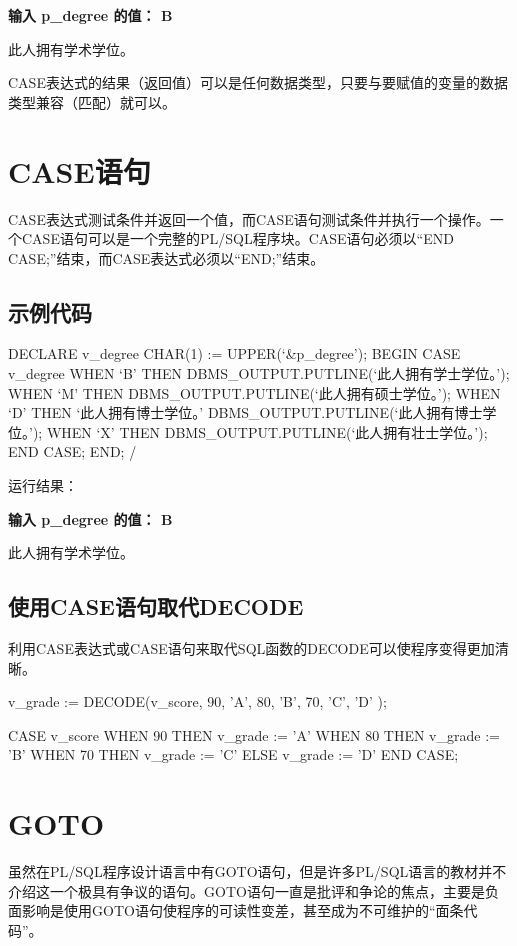\documentclass[11pt, a4paper, oneside, UTF8]{ctexbook}
\let\kaishu\relax %
\begin{document}
{\bfseries\kaishu 输入 p\_degree 的值： B

此人拥有学术学位。}

CASE表达式的结果（返回值）可以是任何数据类型，只要与要赋值的变量的数据类型兼容（匹配）就可以。

\section{CASE语句}
CASE表达式测试条件并返回一个值，而CASE语句测试条件并执行一个操作。一个CASE语句可以是一个完整的PL/SQL程序块。CASE语句必须以“END CASE;”结束，而CASE表达式必须以“END;”结束。
\subsection{示例代码}
\begin{plsql}
DECLARE
  v_degree CHAR(1) := UPPER(‘&p_degree’);
BEGIN
  CASE v_degree
    WHEN ‘B’ THEN 
      DBMS_OUTPUT.PUTLINE(‘此人拥有学士学位。’);
    WHEN ‘M’ THEN 
      DBMS_OUTPUT.PUTLINE(‘此人拥有硕士学位。’);
    WHEN ‘D’ THEN ‘此人拥有博士学位。’
      DBMS_OUTPUT.PUTLINE(‘此人拥有博士学位。’);
    WHEN ‘X’ THEN
      DBMS_OUTPUT.PUTLINE(‘此人拥有壮士学位。’);
  END CASE;
END;
/
\end{plsql}
运行结果：

{\bfseries\kaishu 输入 p\_degree 的值： B

此人拥有学术学位。}

\subsection{使用CASE语句取代DECODE}
利用CASE表达式或CASE语句来取代SQL函数的DECODE可以使程序变得更加清晰。
\begin{plsql}[caption=DECODE函数]
v_grade := DECODE(v_score,
  90, 'A',
  80, 'B',
  70, 'C',
  'D'
);
\end{plsql}
\begin{plsql}[caption=CASE表达式]
CASE v_score
  WHEN 90 THEN v_grade := 'A'
  WHEN 80 THEN v_grade := 'B'
  WHEN 70 THEN v_grade := 'C'
  ELSE v_grade := 'D'
END CASE;
\end{plsql}

\section{GOTO}
虽然在PL/SQL程序设计语言中有GOTO语句，但是许多PL/SQL语言的教材并不介绍这一个极具有争议的语句。GOTO语句一直是批评和争论的焦点，主要是负面影响是使用GOTO语句使程序的可读性变差，甚至成为不可维护的“面条代码”。
\end{document}
